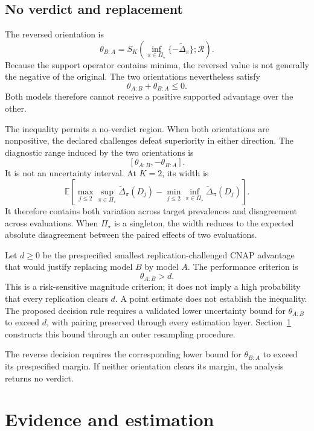 \documentclass[11pt]{article}
\newcommand{\Regime}{\mathcal{R}}
\newcommand{\PSet}{\Pi_\star}
\newcommand{\E}{\mathbb{E}}
\newcommand{\Dta}{\widetilde{\Delta}}
\theoremstyle{remark}
\begin{document}
\subsection{No verdict and replacement}

The reversed orientation is
\[
\theta_{B:A}
=
S_K\left(
\inf_{\pi\in\PSet}\{-\Dta_\pi\};
\Regime
\right).
\]
Because the support operator contains minima, the reversed value is not generally the negative of the original. The two orientations nevertheless satisfy
\begin{equation}
\theta_{A:B}+\theta_{B:A}\leq0.
\label{eq:orientation}
\end{equation}
Both models therefore cannot receive a positive supported advantage over the other.

The inequality permits a no-verdict region. When both orientations are nonpositive, the declared challenges defeat superiority in either direction. The diagnostic range induced by the two orientations is
\[
\left[\theta_{A:B},-\theta_{B:A}\right].
\]
It is not an uncertainty interval. At $K=2$, its width is
\[
\E\!\left[
\max_{j\leq2}\sup_{\pi\in\PSet}\Dta_\pi(D_j)
-
\min_{j\leq2}\inf_{\pi\in\PSet}\Dta_\pi(D_j)
\right].
\]
It therefore contains both variation across target prevalences and disagreement across evaluations. When $\PSet$ is a singleton, the width reduces to the expected absolute disagreement between the paired effects of two evaluations.

Let $d\geq0$ be the prespecified smallest replication-challenged CNAP advantage that would justify replacing model $B$ by model $A$. The performance criterion is
\begin{equation}
\theta_{A:B}>d.
\label{eq:replacement}
\end{equation}
This is a risk-sensitive magnitude criterion; it does not imply a high probability that every replication clears $d$. A point estimate does not establish the inequality. The proposed decision rule requires a validated lower uncertainty bound for $\theta_{A:B}$ to exceed $d$, with pairing preserved through every estimation layer. Section~\ref{sec:estimation} constructs this bound through an outer resampling procedure.

The reverse decision requires the corresponding lower bound for $\theta_{B:A}$ to exceed its prespecified margin. If neither orientation clears its margin, the analysis returns no verdict.

\section{Evidence and estimation}
\label{sec:estimation}
\end{document}
